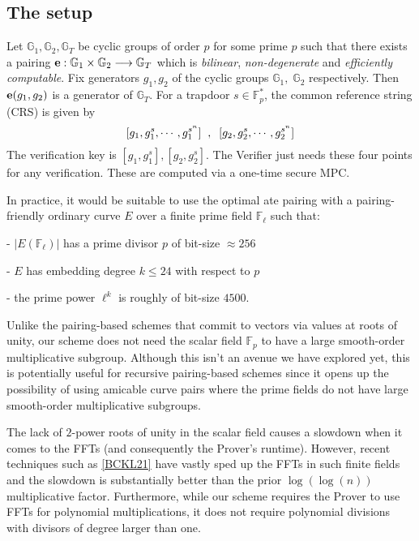 \documentclass[11pt, lettersize, notitlepage, leqno, footskip=0.6cm]{article}
\newcommand{\bF}{\mathbb F}
\newcommand{\bFp}{\mathbb{F}_p}
\newcommand{\lra}{\longrightarrow}
\newcommand{\mb}{\mathbb}
\newcommand{\vs}{\vspace{-0.15cm}}
\newcommand{\noin}{\noindent}
\numberwithin{equation}{section}
\begin{document}

\subsection{\fontsize{11}{11}\selectfont The setup} 

Let $\mb{G}_1, \mb{G}_2, \mb{G}_T$ be cyclic groups of order $p$ for some prime $p$ such that there exists a pairing ${\bf{e}}:\mb{G}_1\times \mb{G}_2\lra \mb{G}_T$ which is \textit{bilinear}, \textit{non-degenerate} and \textit{efficiently computable}. Fix generators $g_1, g_2$ of the cyclic groups $\mb{G}_1,\; \mb{G}_2$ respectively. Then ${\bf{e}}(g_1,g_2)$ is a generator of $\mb{G}_T$. For a trapdoor $s\in \bFp^*$, the common reference string (CRS) is \hypertarget{CRS}{given} by \vs $$ [g_1, g_1^s,\cdots , g_1^{s^n}]\;\;,\;\;[g_2, g_2^s,\cdots , g_2^{s^n}] \vs $$ The verification key is $[g_1,g_1^s], [g_2,g_2^s]$. The Verifier just needs these four points for any verification. These are computed via a one-time secure MPC.


\noin In practice, it would be suitable to use the optimal ate pairing with a pairing-friendly ordinary curve $E$ over a finite prime field $\bF_{\ell}$ such that: \vspace{2mm}

\noin - $|E(\bF_{\ell})|$ has a prime divisor $p$ of bit-size $\approx 256$ \vspace{1mm}

\noin -  $E$ has embedding degree $k\leq 24$ with respect to $p$ \vspace{1mm}

\noin - the prime power $\ell^{k}$ is roughly of bit-size $4500$. \vspace{2mm}

Unlike the pairing-based schemes that commit to vectors via values at roots of unity, our scheme does not need the scalar field $\bFp$ to have a large smooth-order multiplicative subgroup. Although this isn't an avenue we have explored yet, this is potentially useful for recursive pairing-based schemes since it opens up the possibility of using amicable curve pairs where the prime fields do not have large smooth-order multiplicative subgroups.

The lack of $2$-power roots of unity in the scalar field causes a slowdown when it comes to the FFTs (and consequently the Prover's runtime). However, recent techniques such as \hyperlink{noRoots}{[BCKL21]} have vastly sped up the FFTs in such finite fields and the slowdown is substantially better than the prior $\log(\log(n))$ multiplicative factor. Furthermore, while our scheme requires the Prover to use FFTs for polynomial multiplications, it does not require  polynomial divisions with divisors of degree larger than one.
\end{document}
